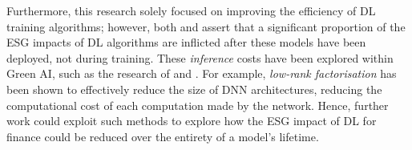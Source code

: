 \documentclass[a4paper, 11pt]{report}
\begin{document}
    Furthermore, this research solely focused on improving the efficiency of DL training algorithms; however, both \citet{bender-2021} and \citet{xu-2021} assert that a significant proportion of the ESG impacts of DL algorithms are inflicted after these models have been deployed, not during training. These \emph{inference} costs have been explored within Green AI, such as the research of \citet{lacoste-2019} and \citet{cai-2022}. For example, \emph{low-rank factorisation} \citep{xu-2021} has been shown to effectively reduce the size of DNN architectures, reducing the computational cost of each computation made by the network. Hence, further work could exploit such methods to explore how the ESG impact of DL for finance could be reduced over the entirety of a model's lifetime.


    \newpage
    \footnotesize
    
\end{document}
